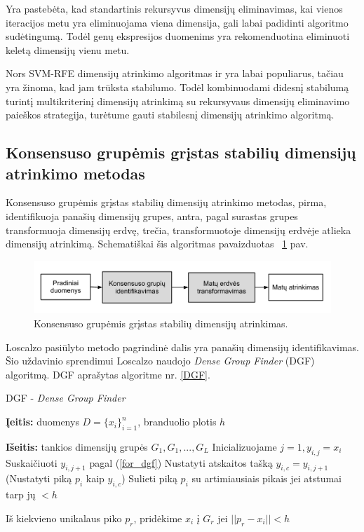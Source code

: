 Yra pastebėta, kad standartinis rekursyvus dimensijų eliminavimas, kai vienos
iteracijos metu yra eliminuojama viena dimensija, gali labai padidinti 
algoritmo sudėtingumą. Todėl genų ekspresijos duomenims yra rekomenduotina
eliminuoti keletą dimensijų vienu metu.

Nors SVM-RFE dimensijų atrinkimo algoritmas ir yra labai populiarus, tačiau yra
žinoma, kad jam trūksta stabilumo. Todėl kombinuodami didesnį stabilumą turintį
multikriterinį dimensijų atrinkimą su rekursyvaus dimensijų eliminavimo paieškos
strategija, turėtume gauti stabilesnį dimensijų atrinkimo algoritmą.

\subsection{Konsensuso grupėmis grįstas stabilių dimensijų atrinkimo metodas}

Konsensuso grupėmis grįstas stabilių dimensijų atrinkimo metodas\cite{loscalzo2009consensus}, pirma, identifikuoja panašių dimensijų grupes, antra, pagal surastas grupes transformuoja dimensijų erdvę, trečia, transformuotoje dimensijų erdvėje atlieka dimensijų atrinkimą. Schematiškai šis algoritmas pavaizduotas  ~\ref{fig:figure7} pav.

\begin{figure}
 \centering
 \includegraphics[width=\textwidth]{images/consensus_group_based_feature_selection_framework.pdf}
 \caption{Konsensuso grupėmis grįstas stabilių dimensijų atrinkimas.}
 \label{fig:figure7}
\end{figure}
Loscalzo pasiūlyto metodo pagrindinė dalis yra panašių dimensijų identifikavimas. Šio uždavinio sprendimui Loscalzo naudojo \textit{Dense Group Finder} (DGF) algoritmą. DGF aprašytas algoritme nr. \ref{DGF}.
\begin{algorithm}
\caption{DGF - \textit{Dense Group Finder}}
\label{DGF}
 \begin{algorithmic}
 \item \textbf{Įeitis:} duomenys $D=\{x_i\}_{i=1}^n$, branduolio plotis $h$
 \item \textbf{Išeitis:} tankios dimensijų grupės $G_1, G_1,..., G_L$
  \State Inicializuojame $j=1, y_{i,j}=x_i$
  \Repeat
    \State Suskaičiuoti $y_{i, j+1}$ pagal (\ref{for_dgf})
  \State Nustatyti atskaitos tašką $y_{i,c} = y_{i,j+1}$ (Nustatyti piką $p_i$ kaip $y_{i,c}$)
  \State Sulieti piką $p_i$ su artimiausiais pikais jei atstumai tarp jų $ < h$
 \EndFor
 \item Iš kiekvieno unikalaus piko $p_r$, pridėkime $x_i$ į $G_r$ jei $||p_r - x_i|| < h$
 \end{algorithmic}
\end{algorithm}


